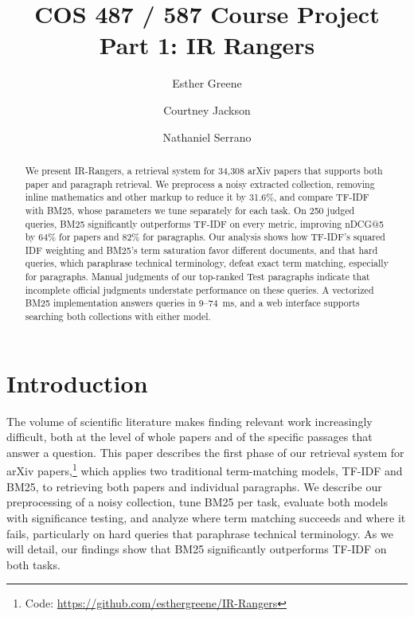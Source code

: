 \documentclass[sigconf,nonacm]{acmart}
\begin{document}
\title{COS 487 / 587 Course Project Part 1: IR Rangers}

\author{Esther Greene}

\author{Courtney Jackson}

\author{Nathaniel Serrano}

\begin{abstract}
We present IR-Rangers, a retrieval system for 34,308 arXiv papers that supports both paper 
and paragraph retrieval. We preprocess a noisy extracted collection, removing inline 
mathematics and other markup to reduce it by 31.6\%, and compare TF-IDF with BM25, 
whose parameters we tune separately for each task. On 250 judged queries, BM25 significantly 
outperforms TF-IDF on every metric, improving nDCG@5 by 64\% for papers and 82\% for 
paragraphs. Our analysis shows how TF-IDF's squared IDF weighting and BM25's term 
saturation favor different documents, and that hard queries, which paraphrase technical 
terminology, defeat exact term matching, especially for paragraphs. Manual judgments of our 
top-ranked Test paragraphs indicate that incomplete official judgments understate performance 
on these queries. A vectorized BM25 implementation answers queries in 9--74~ms, and a web interface 
supports searching both collections with either model.
\end{abstract}


\maketitle

\section{Introduction}
The volume of scientific literature makes finding relevant work
increasingly difficult, both at the level of whole papers and of the
specific passages that answer a question. This paper describes the first
phase of our retrieval system for arXiv papers,\footnote{Code: \url{https://github.com/esthergreene/IR-Rangers}} 
which applies two traditional term-matching models, TF-IDF and BM25, to 
retrieving both papers and individual paragraphs. We describe our preprocessing 
of a noisy collection, tune BM25 per task, evaluate both models with
significance testing, and analyze where term matching succeeds and where
it fails, particularly on hard queries that paraphrase technical
terminology. As we will detail, our findings show that BM25 
significantly outperforms TF-IDF on both tasks.
\end{document}
